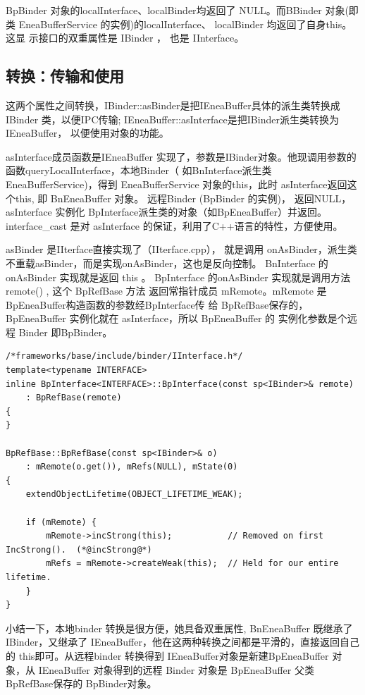 \documentclass[a4paper,11pt]{article}
\begin{document}
BpBinder 对象的localInterface、localBinder均返回了 NULL。而BBinder 对象(即类
EneaBufferService 的实例)的localInterface、 localBinder 均返回了自身this。这显
示接口的双重属性是 IBinder ， 也是 IInterface。

\subsection{转换：传输和使用}
这两个属性之间转换，IBinder::asBinder是把IEneaBuffer具体的派生类转换成IBinder
类，以便IPC传输; IEneaBuffer::asInterface是把IBinder派生类转换为IEneaBuffer，
以便使用对象的功能。

asInterface\label{code:asInterface}成员函数是IEneaBuffer
实现了，参数是IBinder对象。他现调用参数的函数queryLocalInterface，本地Binder（
如BnInterface派生类EneaBufferService)，得到 EneaBufferService 对象的this，此时
asInterface返回这个this, 即 BnEneaBuffer 对象。 远程Binder (BpBinder 的实例)，
返回NULL，asInterface 实例化 BpInterface派生类的对象（如BpEneaBuffer）并返回。
interface_cast 是对 asInterface 的保证，利用了C++语言的特性，方便使用。

asBinder 是IIterface直接实现了（IIterface.cpp）， 就是调用
onAsBinder，派生类不重载asBinder，而是实现onAsBinder，这也是反向控制。
BnInterface 的onAsBinder  实现就是返回 this 。
 BpInterface 的onAsBinder 实现就是调用方法 remote() , 这个 BpRefBase 方法
 返回常指针成员 mRemote。mRemote 是 BpEneaBuffer构造函数的参数经BpInterface传
 给 BpRefBase保存的，BpEneaBuffer 实例化就在 asInterface，所以 BpEneaBuffer 的
 实例化参数是个远程 Binder 即BpBinder。

\begin{lstlisting}[caption=BpInterface 的构造函数,label={BpInterfaceConstructor}]
/*frameworks/base/include/binder/IInterface.h*/
template<typename INTERFACE>
inline BpInterface<INTERFACE>::BpInterface(const sp<IBinder>& remote)
    : BpRefBase(remote)
{
}

BpRefBase::BpRefBase(const sp<IBinder>& o)
    : mRemote(o.get()), mRefs(NULL), mState(0)
{
    extendObjectLifetime(OBJECT_LIFETIME_WEAK);

    if (mRemote) {
        mRemote->incStrong(this);           // Removed on first IncStrong().  (*@incStrong@*)
        mRefs = mRemote->createWeak(this);  // Held for our entire lifetime.
    }
}

\end{lstlisting}

小结一下，本地binder 转换是很方便，她具备双重属性, BnEneaBuffer 既继承了
IBinder，又继承了 IEneaBuffer，他在这两种转换之间都是平滑的，直接返回自己的
this即可。从远程binder 转换得到 IEneaBuffer对象是新建BpEneaBuffer 对象，从
IEneaBuffer 对象得到的远程 Binder 对象是 BpEneaBuffer 父类 BpRefBase保存的
BpBinder对象。
\end{document}
